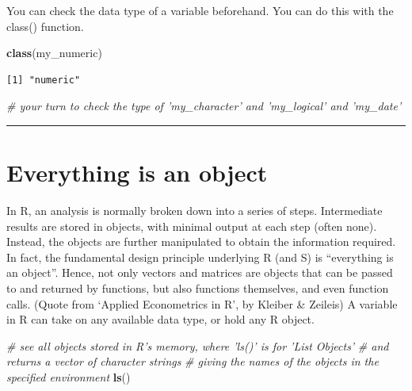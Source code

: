 \documentclass[
]{book}
\newenvironment{Shaded}{\begin{snugshade}}{\end{snugshade}}
\newcommand{\CommentTok}[1]{\textcolor[rgb]{0.56,0.35,0.01}{\textit{#1}}}
\newcommand{\KeywordTok}[1]{\textcolor[rgb]{0.13,0.29,0.53}{\textbf{#1}}}
\newcommand{\NormalTok}[1]{#1}
\begin{document}
You can check the data type of a variable beforehand. You can do this with the class() function.

\begin{Shaded}
\begin{Highlighting}[]
\KeywordTok{class}\NormalTok{(my_numeric)}
\end{Highlighting}
\end{Shaded}

\begin{verbatim}
[1] "numeric"
\end{verbatim}

\begin{Shaded}
\begin{Highlighting}[]
\CommentTok{# your turn to check the type of 'my_character' and 'my_logical' and 'my_date'}
\end{Highlighting}
\end{Shaded}

\begin{center}\rule{0.5\linewidth}{0.5pt}\end{center}

\hypertarget{everything-is-an-object}{%
\section{Everything is an object}\label{everything-is-an-object}}

In R, an analysis is normally broken down into a series
of steps. Intermediate results are stored in objects, with minimal output at
each step (often none). Instead, the objects are further manipulated to obtain
the information required. In fact, the fundamental design principle underlying R (and S) is ``everything
is an object''. Hence, not only vectors and matrices are objects that
can be passed to and returned by functions, but also functions themselves,
and even function calls. (Quote from `Applied Econometrics in R', by Kleiber \& Zeileis) A variable in R can take on any available data type, or hold any R object.

\begin{Shaded}
\begin{Highlighting}[]
\CommentTok{# see all objects stored in R's memory, where 'ls()' is for 'List Objects' }
\CommentTok{# and returns a vector of character strings}
\CommentTok{# giving the names of the objects in the specified environment}
\KeywordTok{ls}\NormalTok{()}
\end{Highlighting}
\end{Shaded}
\end{document}

